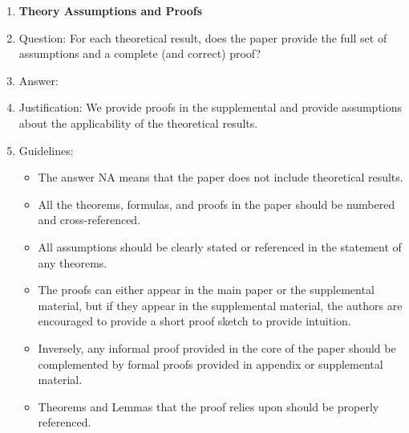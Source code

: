 \documentclass{article} %
\newcounter{ct}
\theoremstyle{definition}
\theoremstyle{remark}
\begin{document}
\begin{enumerate}
\item {\bf Theory Assumptions and Proofs}
    \item[] Question: For each theoretical result, does the paper provide the full set of assumptions and a complete (and correct) proof?
    \item[] Answer: \answerYes{} %
    \item[] Justification: We provide proofs in the supplemental and provide assumptions about the applicability of the theoretical results.
    \item[] Guidelines:
    \begin{itemize}
        \item The answer NA means that the paper does not include theoretical results. 
        \item All the theorems, formulas, and proofs in the paper should be numbered and cross-referenced.
        \item All assumptions should be clearly stated or referenced in the statement of any theorems.
        \item The proofs can either appear in the main paper or the supplemental material, but if they appear in the supplemental material, the authors are encouraged to provide a short proof sketch to provide intuition. 
        \item Inversely, any informal proof provided in the core of the paper should be complemented by formal proofs provided in appendix or supplemental material.
        \item Theorems and Lemmas that the proof relies upon should be properly referenced. 
    \end{itemize}


\end{enumerate}
\end{document}
